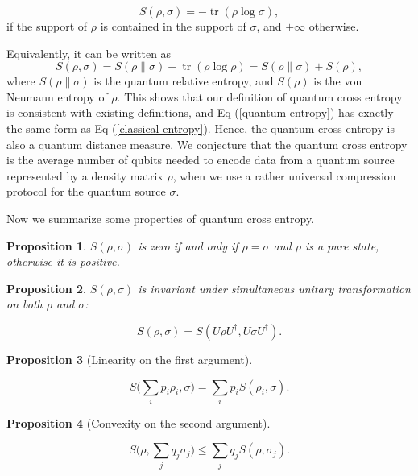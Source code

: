 \documentclass[11pt]{article}
\newtheorem{proposition}{Proposition}
\theoremstyle{definition}
\DeclareMathOperator{\tr}{\text{tr}}
\begin{document}
\begin{equation}
    S(\rho, \sigma) = -\tr(\rho \log \sigma),
\end{equation}
if the support of $\rho$ is contained in the support of $\sigma$, and $+\infty$ otherwise.

Equivalently, it can be written as 
\begin{equation}
\label{quantum entropy}
    S(\rho, \sigma) = S( \rho \| \sigma) 
    - \tr(\rho \log \rho) = S(\rho \| \sigma) + S(\rho),
\end{equation}
where $S(\rho\|\sigma)$ is the quantum relative entropy, and $S(\rho)$ is the von Neumann entropy of $\rho$. This shows that our definition of quantum cross entropy is consistent with existing definitions, and Eq (\ref{quantum entropy}) has exactly the same form as Eq (\ref{classical entropy}). Hence, the quantum cross entropy is also a quantum distance measure. 
We conjecture that the quantum cross entropy is the average number of qubits needed to encode data from a quantum source represented by a density matrix $\rho$, when we use a rather universal compression protocol for the quantum source $\sigma$.

Now we summarize some properties of quantum cross entropy. 

\begin{proposition}
 $S(\rho, \sigma)$ is zero if and only if $\rho = \sigma$ and $\rho$ is a pure state, otherwise it is positive.
\end{proposition}

\begin{proposition}
 $S(\rho, \sigma)$ is invariant under simultaneous unitary transformation on both $\rho$ and $\sigma$:
\end{proposition}

\begin{equation}
     S(\rho, \sigma) = S(U \rho U^\dagger, U \sigma U^\dagger).
\end{equation}

\begin{proposition}[Linearity on the first argument]\label{linearity}


\begin{equation}
    S \Big(\sum_i p_i \rho_i, \sigma \Big) = 
    \sum_i p_i S(\rho_i, \sigma).
\end{equation}

\end{proposition}

\begin{proposition}[Convexity on the second argument]\label{convexity}

\begin{equation}
    S \Big(\rho, \sum_j q_j \sigma_j \Big)
    \leq \sum_j q_j S (\rho, \sigma_j ).
\end{equation}
\end{proposition}
\end{document}
